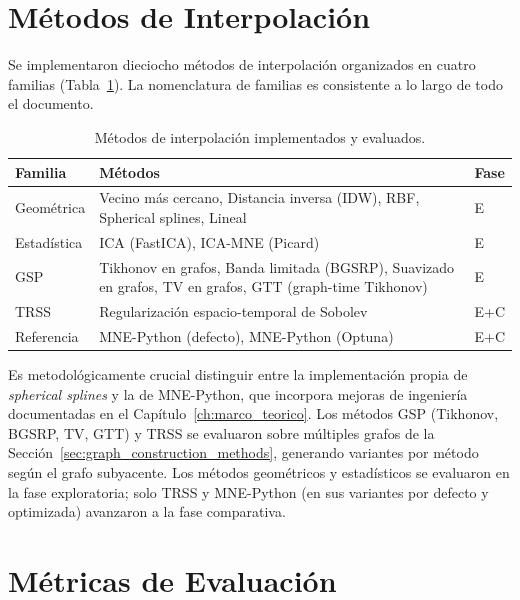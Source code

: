 \section{Métodos de Interpolación}
\label{sec:interpolation_methods}

Se implementaron dieciocho métodos de interpolación organizados en cuatro familias (Tabla~\ref{tab:methods}). La nomenclatura de familias es consistente a lo largo de todo el documento.

\begin{table}[htbp]
\centering
\caption{Métodos de interpolación implementados y evaluados.}
\label{tab:methods}
\small
\begin{tabular}{@{}lp{6.5cm}l@{}}
\toprule
Familia & Métodos & Fase \\
\midrule
Geométrica & Vecino más cercano, Distancia inversa (IDW), RBF, Spherical splines, Lineal & E \\
Estadística & ICA (FastICA), ICA-MNE (Picard) & E \\
GSP & Tikhonov en grafos, Banda limitada (BGSRP), Suavizado en grafos, TV en grafos, GTT (graph-time Tikhonov) & E \\
TRSS & Regularización espacio-temporal de Sobolev & E+C \\
Referencia & MNE-Python (defecto), MNE-Python (Optuna) & E+C \\
\bottomrule
\end{tabular}
\end{table}

Es metodológicamente crucial distinguir entre la implementación propia de \textit{spherical splines} y la de MNE-Python, que incorpora mejoras de ingeniería documentadas en el Capítulo~\ref{ch:marco_teorico}. Los métodos GSP (Tikhonov, BGSRP, TV, GTT) y TRSS se evaluaron sobre múltiples grafos de la Sección~\ref{sec:graph_construction_methods}, generando variantes por método según el grafo subyacente. Los métodos geométricos y estadísticos se evaluaron en la fase exploratoria; solo TRSS y MNE-Python (en sus variantes por defecto y optimizada) avanzaron a la fase comparativa.

\section{Métricas de Evaluación}
\label{sec:metricas}

